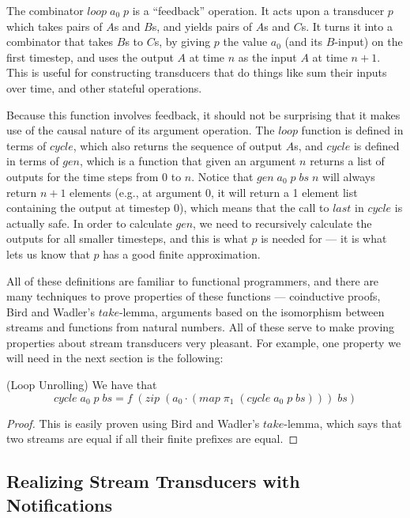 \documentclass[preprint,natbib]{sigplanconf}
\begin{document}
The combinator $loop\;a_0\;p$ is a ``feedback'' operation. It acts
upon a transducer $p$ which takes pairs of $A$s and $B$s, and yields
pairs of $A$s and $C$s. It turns it into a combinator that takes $B$s
to $C$s, by giving $p$ the value $a_0$ (and its $B$-input) on the
first timestep, and uses the output $A$ at time $n$ as the input $A$
at time $n+1$. This is useful for constructing transducers that do
things like sum their inputs over time, and other stateful operations. 

Because this function involves feedback, it should not be surprising
that it makes use of the causal nature of its argument operation. The
$loop$ function is defined in terms of $cycle$, which also returns the
sequence of output $A$s, and $cycle$ is defined in terms of $gen$,
which is a function that given an argument $n$ returns a list of
outputs for the time steps from $0$ to $n$. Notice that
$gen\;a_0\;p\;bs\;n$ will always return $n+1$ elements (e.g., at
argument 0, it will return a 1 element list containing the output at
timestep 0), which means that the call to $last$ in $cycle$ is
actually safe. In order to calculate $gen$, we need to recursively
calculate the outputs for all smaller timesteps, and this is what
$\hat{p}$ is needed for --- it is what lets us know that $p$ has a good
finite approximation.

All of these definitions are familiar to functional programmers, and
there are many techniques to prove properties of these functions ---
coinductive proofs, Bird and Wadler's $take$-lemma, arguments based on
the isomorphism between streams and functions from natural
numbers. All of these serve to make proving properties about stream
transducers very pleasant. For example, one property we will need in
the next section is the following:

\begin{lemma}{(Loop Unrolling)} We have that 
  \begin{displaymath}
    cycle\;a_0\;p\;bs = f\;(zip\;(a_0\cdot(map\;\pi_1\;(cycle\;a_0\;p\;bs)))\;bs)
  \end{displaymath}
\end{lemma}

\begin{proof}
  This is easily proven using Bird and Wadler's $take$-lemma, which
  says that two streams are equal if all their finite prefixes are
  equal.
\end{proof}


\subsection{Realizing Stream Transducers with Notifications}
\end{document}
